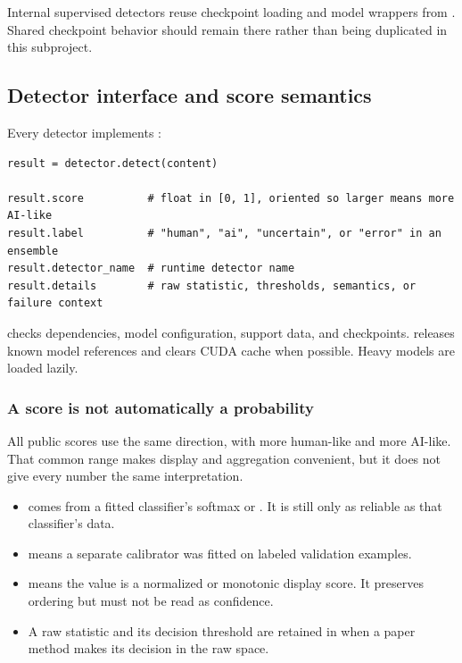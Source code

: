 Internal supervised detectors reuse checkpoint loading and model
wrappers from \texttt{}. Shared checkpoint
behavior should remain there rather than being duplicated in this
subproject.

\subsection{Detector interface and score
semantics}\label{record-docs-research-guide-md-detector-interface-and-score-semantics}

Every detector implements \texttt{}:

\begin{Verbatim}
result = detector.detect(content)

result.score          # float in [0, 1], oriented so larger means more AI-like
result.label          # "human", "ai", "uncertain", or "error" in an ensemble
result.detector_name  # runtime detector name
result.details        # raw statistic, thresholds, semantics, or failure context
\end{Verbatim}

\texttt{} checks dependencies, model
configuration, support data, and checkpoints.
\texttt{} releases known model references and clears
CUDA cache when possible. Heavy models are loaded lazily.

\subsubsection{A score is not automatically a
probability}\label{record-docs-research-guide-md-a-score-is-not-automatically-a-probability}

All public scores use the same direction, with \texttt{}
more human-like and \texttt{} more AI-like. That common
range makes display and aggregation convenient, but it does not give
every number the same interpretation.

\begin{itemize}
\tightlist
\item
  \texttt{} comes from a fitted
  classifier's softmax or \texttt{}. It is
  still only as reliable as that classifier's data.
\item
  \texttt{} means a separate
  calibrator was fitted on labeled validation examples.
\item
  \texttt{} means the value is a normalized or
  monotonic display score. It preserves ordering but must not be read as
  confidence.
\item
  A raw statistic and its decision threshold are retained in
  \texttt{} when a paper method makes its decision in
  the raw space.
\end{itemize}

